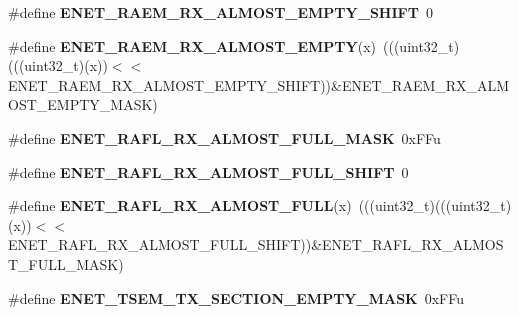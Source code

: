 \begin{DoxyCompactItemize}
\item 
\#define {\bfseries E\+N\+E\+T\+\_\+\+R\+A\+E\+M\+\_\+\+R\+X\+\_\+\+A\+L\+M\+O\+S\+T\+\_\+\+E\+M\+P\+T\+Y\+\_\+\+S\+H\+I\+FT}~0\hypertarget{group__ENET__Register__Masks_gad89e89d3db86bdebd82cba2f2994e4df}{}\label{group__ENET__Register__Masks_gad89e89d3db86bdebd82cba2f2994e4df}

\item 
\#define {\bfseries E\+N\+E\+T\+\_\+\+R\+A\+E\+M\+\_\+\+R\+X\+\_\+\+A\+L\+M\+O\+S\+T\+\_\+\+E\+M\+P\+TY}(x)~(((uint32\+\_\+t)(((uint32\+\_\+t)(x))$<$$<$E\+N\+E\+T\+\_\+\+R\+A\+E\+M\+\_\+\+R\+X\+\_\+\+A\+L\+M\+O\+S\+T\+\_\+\+E\+M\+P\+T\+Y\+\_\+\+S\+H\+I\+FT))\&E\+N\+E\+T\+\_\+\+R\+A\+E\+M\+\_\+\+R\+X\+\_\+\+A\+L\+M\+O\+S\+T\+\_\+\+E\+M\+P\+T\+Y\+\_\+\+M\+A\+SK)\hypertarget{group__ENET__Register__Masks_gaf15ad096303b974696f055666297cf38}{}\label{group__ENET__Register__Masks_gaf15ad096303b974696f055666297cf38}

\item 
\#define {\bfseries E\+N\+E\+T\+\_\+\+R\+A\+F\+L\+\_\+\+R\+X\+\_\+\+A\+L\+M\+O\+S\+T\+\_\+\+F\+U\+L\+L\+\_\+\+M\+A\+SK}~0x\+F\+Fu\hypertarget{group__ENET__Register__Masks_ga3b79bb95900a65117a1e64a98e0ca741}{}\label{group__ENET__Register__Masks_ga3b79bb95900a65117a1e64a98e0ca741}

\item 
\#define {\bfseries E\+N\+E\+T\+\_\+\+R\+A\+F\+L\+\_\+\+R\+X\+\_\+\+A\+L\+M\+O\+S\+T\+\_\+\+F\+U\+L\+L\+\_\+\+S\+H\+I\+FT}~0\hypertarget{group__ENET__Register__Masks_ga3b190ba30467b67b3d17589f3f193475}{}\label{group__ENET__Register__Masks_ga3b190ba30467b67b3d17589f3f193475}

\item 
\#define {\bfseries E\+N\+E\+T\+\_\+\+R\+A\+F\+L\+\_\+\+R\+X\+\_\+\+A\+L\+M\+O\+S\+T\+\_\+\+F\+U\+LL}(x)~(((uint32\+\_\+t)(((uint32\+\_\+t)(x))$<$$<$E\+N\+E\+T\+\_\+\+R\+A\+F\+L\+\_\+\+R\+X\+\_\+\+A\+L\+M\+O\+S\+T\+\_\+\+F\+U\+L\+L\+\_\+\+S\+H\+I\+FT))\&E\+N\+E\+T\+\_\+\+R\+A\+F\+L\+\_\+\+R\+X\+\_\+\+A\+L\+M\+O\+S\+T\+\_\+\+F\+U\+L\+L\+\_\+\+M\+A\+SK)\hypertarget{group__ENET__Register__Masks_gab63ee8b6dcb24483573b2ef4d95c09e9}{}\label{group__ENET__Register__Masks_gab63ee8b6dcb24483573b2ef4d95c09e9}

\item 
\#define {\bfseries E\+N\+E\+T\+\_\+\+T\+S\+E\+M\+\_\+\+T\+X\+\_\+\+S\+E\+C\+T\+I\+O\+N\+\_\+\+E\+M\+P\+T\+Y\+\_\+\+M\+A\+SK}~0x\+F\+Fu\hypertarget{group__ENET__Register__Masks_ga2e0f28c4f62db96b87ef5ad97474613d}{}\label{group__ENET__Register__Masks_ga2e0f28c4f62db96b87ef5ad97474613d}


\end{DoxyCompactItemize}

